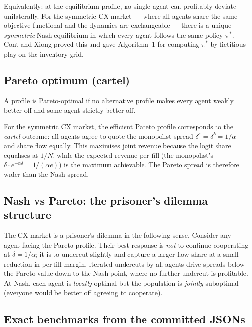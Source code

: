 Equivalently: at the equilibrium profile, no single agent can profitably deviate unilaterally. For the symmetric CX market --- where all agents share the same objective functional and the dynamics are exchangeable --- there is a unique \emph{symmetric} Nash equilibrium in which every agent follows the same policy $\pi^*$. Cont and Xiong \cite{cont2024} proved this and gave Algorithm~1 for computing $\pi^*$ by fictitious play on the inventory grid.

\subsection{Pareto optimum (cartel)}

\begin{definition}
A profile is Pareto-optimal if no alternative profile makes every agent weakly better off and some agent strictly better off.
\end{definition}

For the symmetric CX market, the efficient Pareto profile corresponds to the \emph{cartel} outcome: all agents agree to quote the monopolist spread $\delta^a = \delta^b = 1/\alpha$ and share flow equally. This maximises joint revenue because the logit share equalises at $1/N$, while the expected revenue per fill (the monopolist's $\delta \cdot e^{-\alpha \delta} = 1/(\alpha e)$) is the maximum achievable. The Pareto spread is therefore wider than the Nash spread.

\subsection{Nash vs Pareto: the prisoner's dilemma structure}

The CX market is a prisoner's-dilemma in the following sense. Consider any agent facing the Pareto profile. Their best response is \emph{not} to continue cooperating at $\delta = 1/\alpha$; it is to undercut slightly and capture a larger flow share at a small reduction in per-fill margin. Iterated undercuts by all agents drive spreads below the Pareto value down to the Nash point, where no further undercut is profitable. At Nash, each agent is \emph{locally} optimal but the population is \emph{jointly} suboptimal (everyone would be better off agreeing to cooperate).

\subsection{Exact benchmarks from the committed JSONs}

